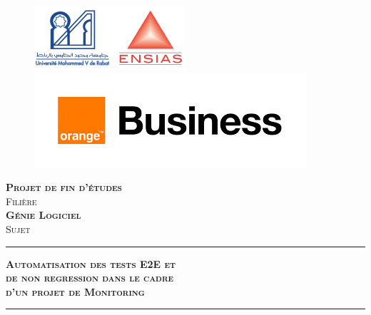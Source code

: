\begin{titlepage}\label{TitlePäge}
\begin{center}
    \begin{figure}[!htb]
        \begin{minipage}{0.5\linewidth}
            \includegraphics[width=0.58\linewidth]{logos/Um5-ENSIAS.png}
        \end{minipage}
        \hspace{1.8cm}
        \begin{minipage}{0.5\linewidth}
            \includegraphics[width=0.84\linewidth]{logos/OBS.png}
        \end{minipage}
    \end{figure}
     
   \vspace*{1.6cm}

  \textsc{\huge \bfseries Projet de fin d'études}\\[1.3cm]
  \textsc{\small Filière}\\[1cm]
  \textsc{\huge \bfseries Génie Logiciel }\\[1.4cm]
  \textsc{\small Sujet}\\
  \begin{center}
 \rule{0.5\linewidth}{1pt}
 \end{center}
  \textsc{\huge \bfseries Automatisation des tests E2E et\\\vspace*{0.4cm} de non regression dans le cadre\\\vspace*{0.6cm} d’un projet de Monitoring }
  \begin{center}
 \rule{0.5\linewidth}{1pt}
 \end{center}
 

\end{center}
\end{titlepage}

